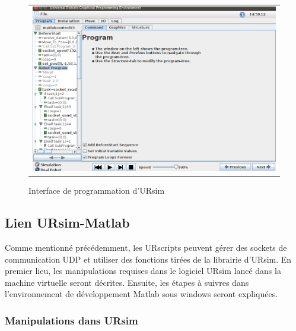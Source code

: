 \documentclass[root.tex]{subfiles}
\begin{document}
\begin{figure}
 \begin{center}
  \begin{tabular}{c}
    \includegraphics[trim=0cm 0cm 0cm 0cm, scale=0.45]{screenshots_tuto_ursim/interface_prog.png}
  \end{tabular}
 \end{center}
\caption{Interface de programmation d'URsim}
 \label{fig:ui_programmation}
\end{figure}



\subsection{Lien URsim-Matlab}
Comme mentionné précédemment, les URscripts peuvent gérer des sockets de communication UDP et utiliser des fonctions tirées de la librairie d'URsim. 
En premier lieu, les manipulations requises dans le logiciel URsim lancé dans la machine virtuelle seront décrites.
Ensuite, les étapes à suivres dans l'environnement de développement Matlab sous windows seront expliquées.

\subsubsection{Manipulations dans URsim}
\end{document}
